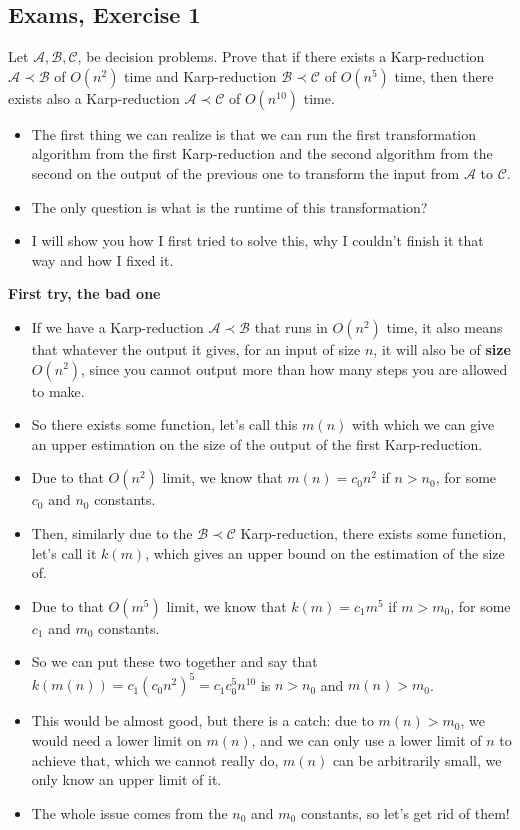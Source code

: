 \subsection {Exams, Exercise 1}


Let $\mathcal{A}, \mathcal{B}, \mathcal{C}$, be decision problems. Prove that if there exists a Karp-reduction $\mathcal{A} \prec \mathcal{B}$ of $O(n^2)$ time and Karp-reduction $\mathcal{B} \prec \mathcal{C}$ of $O(n^5)$ time, then there exists also a Karp-reduction $\mathcal{A}\prec{}\mathcal{C}$ of $O(n^10)$ time.


\begin{itemize}
    \item The first thing we can realize is that we can run the first transformation algorithm from the first Karp-reduction and the second algorithm from the second on the output of the previous one to transform the input from $\mathcal{A}$ to $\mathcal{C}$.
    \item The only question is what is the runtime of this transformation?
    \item I will show you how I first tried to solve this, why I couldn't finish it that way and how I fixed it.
\end{itemize}

\textbf{First try, the bad one}

\begin{itemize}
    \item If we have a Karp-reduction $\mathcal{A} \prec \mathcal{B}$ that runs in $O(n^2)$ time, it also means that whatever the output it gives, for an input of size $n$, it will also be of \textbf{size} $O(n^2)$, since you cannot output more than how many steps you are allowed to make.
    \item So there exists some function, let's call this $m(n)$ with which we can give an upper estimation on the size of the output of the first Karp-reduction.
    \item Due to that $O(n^2)$ limit, we know that $m(n) = c_0n^2$ if $n>n_0$, for some $c_0$ and $n_0$ constants.
    \item Then, similarly due to the $\mathcal{B} \prec \mathcal{C}$ Karp-reduction, there exists some function, let's call it $k(m)$, which gives an upper bound on the estimation of the size of.
    \item Due to that $O(m^5)$ limit, we know that $k(m) = c_1m^5$ if $m>m_0$, for some $c_1$ and $m_0$ constants.
    \item So we can put these two together and say that  $k(m(n)) = c_1(c_0n^2)^5 = c_1c_0^5n^10$ is $n > n_0$ and $m(n) > m_0$.
    \item This would be almost good, but there is a catch: due to $m(n) > m_0$, we would need a lower limit on $m(n)$, and we can only use a lower limit of $n$ to achieve that, which we cannot really do, $m(n)$ can be arbitrarily small, we only know an upper limit of it.
    \item The whole issue comes from the $n_0$ and $m_0$ constants, so let's get rid of them!
\end{itemize}

